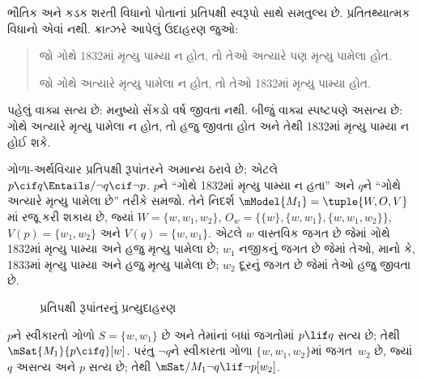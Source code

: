 \documentclass[../../../include/open-logic-section]{subfiles}
\begin{document}


ભૌતિક અને કડક શરતી વિધાનો પોતાનાં પ્રતિપક્ષી સ્વરૂપો સાથે સમતુલ્ય
છે. પ્રતિતથ્યાત્મક વિધાનો એવાં નથી. ક્રાત્ઝરે આપેલું ઉદાહરણ જુઓ:
\begin{quote}
  જો ગોથે 1832માં મૃત્યુ પામ્યા ન હોત, તો તેઓ અત્યારે પણ મૃત્યુ પામેલા હોત.

  જો ગોથે અત્યારે મૃત્યુ પામેલા ન હોત, તો તેઓ 1832માં મૃત્યુ પામ્યા હોત.
\end{quote}
પહેલું વાક્ય સત્ય છે: મનુષ્યો સેંકડો વર્ષ જીવતા નથી. બીજું વાક્ય
સ્પષ્ટપણે અસત્ય છે: ગોથે અત્યારે મૃત્યુ પામેલા ન હોત, તો હજુ જીવતા
હોત અને તેથી 1832માં મૃત્યુ પામ્યા ન હોઈ શકે.

\begin{ex}
  ગોળા-અર્થવિચાર પ્રતિપક્ષી રૂપાંતરને અમાન્ય ઠરાવે છે; એટલે $p
  \cif q \Entails/ \lnot q \cif \lnot p$. $p$ને ``ગોથે 1832માં
  મૃત્યુ પામ્યા ન હતા'' અને $q$ને ``ગોથે અત્યારે મૃત્યુ પામેલા છે''
  તરીકે સમજો. તેને નિદર્શ $\mModel{M_1} = \tuple{W, O, V}$માં
  રજૂ કરી શકાય છે, જ્યાં $W = \{w, w_1, w_2\}$,
  $O_w = \{\{w\}, \{w, w_1\}, \{w, w_1, w_2\}\}$,
  $V(p) = \{w_1, w_2\}$ અને $V(q) = \{w, w_1\}$. એટલે $w$
  વાસ્તવિક જગત છે જેમાં ગોથે 1832માં મૃત્યુ પામ્યા અને હજુ મૃત્યુ
  પામેલા છે; $w_1$ નજીકનું જગત છે જેમાં તેઓ, માનો કે, 1833માં
  મૃત્યુ પામ્યા અને હજુ મૃત્યુ પામેલા છે; $w_2$ દૂરનું જગત છે જેમાં
  તેઓ હજુ જીવતા છે.
\begin{figure}
\begin{center}
\caption{પ્રતિપક્ષી રૂપાંતરનું પ્રત્યુદાહરણ}
\end{center}
\end{figure}
$p$ને સ્વીકારતો ગોળો $S = \{w, w_1\}$ છે અને તેમાંનાં બધાં
જગતોમાં $p \lif q$ સત્ય છે; તેથી $\mSat{M_1}{p \cif q}[w]$.
પરંતુ $\lnot q$ને સ્વીકારતા ગોળા $\{w, w_1, w_2\}$માં જગત~$w_2$
છે, જ્યાં $q$ અસત્ય અને $p$ સત્ય છે; તેથી
$\mSat/{M_1}{\lnot q \lif \lnot p}[w_2]$.
\end{ex}
\end{document}
